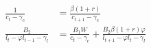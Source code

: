   \begin{align}
    \frac{1}{c_t -\gamma_c} &=\frac{\beta(1+r)}{c_{t+1}-\gamma_c} \label{eq:sg_euler_c} \\
    \frac{B_2}{l_t - \varphi l_{t-1} - \gamma_l} &= \frac{B_1 W}{c_t - \gamma_c} + \frac{B_2 \beta (1+r) \varphi}{l_{t+1}-\varphi l_t - \gamma_l} \label{eq:sg_euler_l}
  \end{align}
